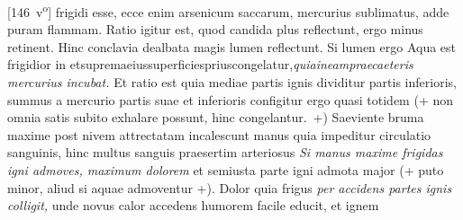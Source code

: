 %
% 
[146~v\textsuperscript{o}] 
%
frigidi esse, ecce enim arsenicum saccarum\protect{}, mercurius sublimatus\protect{}, adde puram flammam. Ratio igitur est, quod candida plus  reflectunt, ergo minus retinent. Hinc conclavia dealbata\protect{} magis lumen reflectunt. Si lumen ergo  Aqua est frigidior in \hfill et\hfill suprema\hfill eius\hfill superficies\hfill prius\hfill congelatur,\hfill \textit{quia\hfill in\hfill eam\hfill prae\hfill caeteris}
\pend
\newpage
\pstart
\noindent\textit{mercurius incubat.} Et ratio est quia mediae partis ignis dividitur  partis inferioris, summus a mercurio partis suae et inferioris configitur ergo quasi totidem  (+ non omnia satis subito exhalare possunt, hinc congelantur.~+) Saeviente bruma maxime post nivem attrectatam incalescunt manus quia impeditur circulatio sanguinis\protect{}, hinc multus sanguis praesertim arteriosus\protect{}  \textit{Si manus maxime frigidas igni admoves, maximum dolorem } et semiusta parte igni admota major (+ puto minor, aliud si aquae admoventur +). Dolor\protect{} quia frigus \textit{per accidens partes ignis colligit,} unde novus calor accedens humorem facile educit, et ignem 
